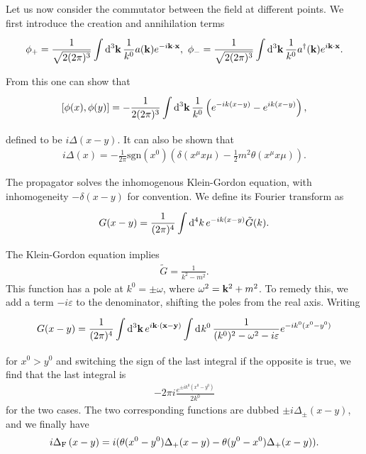 Let us now consider the commutator between the field at different points. We first introduce the creation and annihilation terms
\begin{align*}
	\phi_{+} = \frac{1}{\sqrt{2(2\pi)^{3}}}\integ[3]{}{}{\vb{k}}{\frac{1}{k^{0}}a(\vb{k})e^{-i\vb{k}\cdot\vb{x}}},\ \phi_{-} = \frac{1}{\sqrt{2(2\pi)^{3}}}\integ[3]{}{}{\vb{k}}{\frac{1}{k^{0}}a\adj(\vb{k})e^{i\vb{k}\cdot\vb{x}}}.
\end{align*}
From this one can show that
\begin{align*}
	\comm{\phi(x)}{\phi(y)} = -\frac{1}{2(2\pi)^{3}}\integ[3]{}{}{\vb{k}}{\frac{1}{k^{0}}\left(e^{-ik(x - y)} - e^{ik(x - y)}\right)},
\end{align*}
defined to be $i\Delta(x - y)$. It can also be shown that
\begin{align*}
	i\Delta(x) = -\frac{1}{2\pi}\text{sgn}(x^{0})(\delta(x^{\mu}x{\mu}) - \frac{1}{2}m^{2}\theta(x^{\mu}x{\mu})).
\end{align*}

The propagator solves the inhomogenous Klein-Gordon equation, with inhomogeneity $-\delta(x - y)$ for convention. We define its Fourier transform as
\begin{align*}
	G(x - y) = \frac{1}{(2\pi)^{4}}\int\limits_{}^{}\dd[4]{k}e^{-ik(x - y)}\tilde{G}(k).
\end{align*}
The Klein-Gordon equation implies
\begin{align*}
	\tilde{G} = \frac{1}{k^{2} - m^{2}}.
\end{align*}
This function has a pole at $k^{0} = \pm \omega$, where $\omega^{2} = \vb{k}^{2} + m^{2}$. To remedy this, we add a term $-i\varepsilon$ to the denominator, shifting the poles from the real axis. Writing
\begin{align*}
	G(x - y) = \frac{1}{(2\pi)^{4}}\int\limits_{}^{}\dd[3]{\vb{k}}e^{i\vb{k}\cdot(\vb{x} - \vb{y})}\int\limits_{}^{}\dd[]{k^{0}}\frac{1}{(k^{0})^{2} - \omega^{2} - i\varepsilon}e^{-ik^{0}(x^{0} - y^{0})}
\end{align*}
for $x^{0} > y^{0}$ and switching the sign of the last integral if the opposite is true, we find that the last integral is
\begin{align}
	-2\pi i\frac{e^{\pm ik^{0}(x^{0} - y^{0})}}{2k^{0}}
\end{align}
for the two cases. The two corresponding functions are dubbed $\pm i\Delta_{\pm}(x - y)$, and we finally have
\begin{align*}
	i\Delta_{\text{F}}\left(x - y\right) = i(\theta(x^{0} - y^{0})\Delta_{+}(x - y) - \theta(y^{0} - x^{0})\Delta_{+}(x - y)).
\end{align*}